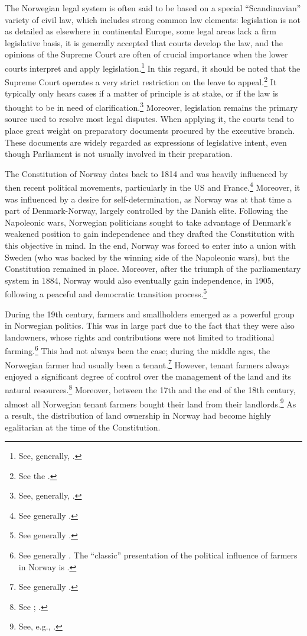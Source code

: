 The Norwegian legal system is often said to be based on a special ``Scandinavian'' variety of civil law, which includes strong common law elements: legislation is not as detailed as elsewhere in continental Europe, some legal areas lack a firm legislative basis, it is generally accepted that courts develop the law, and the opinions of the Supreme Court are often of crucial importance when the lower courts interpret and apply legislation.\footnote{See, generally, \cite{bernitz07}.} In this regard, it should be noted that the Supreme Court operates a very strict restriction on the leave to appeal.\footnote{See the \dni\cite[30-4]{cda05}.} It typically only hears cases if a matter of principle is at stake, or if the law is thought to be in need of clarification.\footnote{See, generally, \cite{skoghoy08}.} Moreover, legislation remains the primary source used to resolve most legal disputes. When applying it, the courts tend to place great weight on preparatory documents procured by the executive branch. These documents are widely regarded as expressions of legislative intent, even though Parliament is not usually involved in their preparation.

The Constitution of Norway dates back to 1814 and was heavily influenced by then recent political movements, particularly in the US and France.\footnote{See generally \cite{mestad14}.} Moreover, it was influenced by a desire for self-determination, as Norway was at that time a part of Denmark-Norway, largely controlled by the Danish elite. Following the Napoleonic wars, Norwegian politicians sought to take advantage of Denmark's weakened position to gain independence and they drafted the Constitution with this objective in mind. In the end, Norway was forced to enter into a union with Sweden (who was backed by the winning side of the Napoleonic wars), but the Constitution remained in place. Moreover, after the triumph of the parliamentary system in 1884, Norway would also eventually gain independence, in 1905, following a peaceful and democratic transition process.\footnote{See generally \cite{sejersted15}.}

During the 19th century, farmers and smallholders emerged as a powerful group in Norwegian politics. This was in large part due to the fact that they were also landowners, whose rights and contributions were not limited to traditional farming.\footnote{See generally \cite{hommerstad14}. The ``classic'' presentation of the political influence of farmers in Norway is \cite{koht26}.} This had not always been the case; during the middle ages, the Norwegian farmer had usually been a tenant.\footnote{See generally \cite{myking05}.} However, tenant farmers always enjoyed a significant degree of control over the management of the land and its natural resources.\footnote{See \cite[59-60]{pryser99}; \cite[226-238]{myking05}.} Moreover, between the 17th and the end of the 18th century, almost all Norwegian tenant farmers bought their land from their landlords.\footnote{See, e.g., \cite[108]{nordtveit15}.} As a result, the distribution of land ownership in Norway had  become highly egalitarian at the time of the Constitution.

